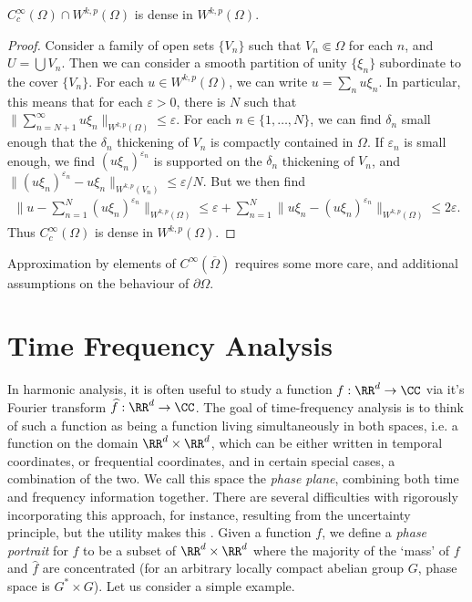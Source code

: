 \begin{theorem}
  $C^\infty_c(\Omega) \cap W^{k,p}(\Omega)$ is dense in $W^{k,p}(\Omega)$.
\end{theorem}
\begin{proof}
  Consider a family of open sets $\{ V_n \}$ such that $V_n \Subset \Omega$ for each $n$, and $U = \bigcup V_n$. Then we can consider a smooth partition of unity $\{ \xi_n \}$ subordinate to the cover $\{ V_n \}$. For each $u \in W^{k,p}(\Omega)$, we can write $u = \sum_n u \xi_n$. In particular, this means that for each $\varepsilon > 0$, there is $N$ such that $\| \sum_{n = N+1}^\infty u \xi_n \|_{W^{k,p}(\Omega)} \leq \varepsilon$. For each $n \in \{ 1, \dots, N \}$, we can find $\delta_n$ small enough that the $\delta_n$ thickening of $V_n$ is compactly contained in $\Omega$. If $\varepsilon_n$ is small enough, we find $(u \xi_n)^{\varepsilon_n}$ is supported on the $\delta_n$ thickening of $V_n$, and $\| (u \xi_n)^{\varepsilon_n} - u \xi_n \|_{W^{k,p}(V_n)} \leq \varepsilon / N$. But we then find
  \begin{align*}
    \| u - \sum_{n = 1}^N (u \xi_n)^{\varepsilon_n} \|_{W^{k,p}(\Omega)} \leq \varepsilon + \sum_{n = 1}^N \| u \xi_n - (u \xi_n)^{\varepsilon_n} \|_{W^{k,p}(\Omega)} \leq 2\varepsilon.
  \end{align*}
  Thus $C_c^\infty(\Omega)$ is dense in $W^{k,p}(\Omega)$.
\end{proof}

Approximation by elements of $C^\infty(\overline{\Omega})$ requires some more care, and additional assumptions on the behaviour of $\partial \Omega$.













\chapter{Time Frequency Analysis}

In harmonic analysis, it is often useful to study a function $f: \RR^d \to \CC$ via it's Fourier transform $\widehat{f}: \RR^d \to \CC$. The goal of time-frequency analysis is to think of such a function as being a function living simultaneously in both spaces, i.e. a function on the domain $\RR^d \times \RR^d$, which can be either written in temporal coordinates, or frequential coordinates, and in certain special cases, a combination of the two. We call this space the \emph{phase plane}, combining both time and frequency information together. There are several difficulties with rigorously incorporating this approach, for instance, resulting from the uncertainty principle, but the utility makes this . Given a function $f$, we define a \emph{phase portrait} for $f$ to be a subset of $\RR^d \times \RR^d$ where the majority of the `mass' of $f$ and $\widehat{f}$ are concentrated (for an arbitrary locally compact abelian group $G$, phase space is $G^* \times G$). Let us consider a simple example.

